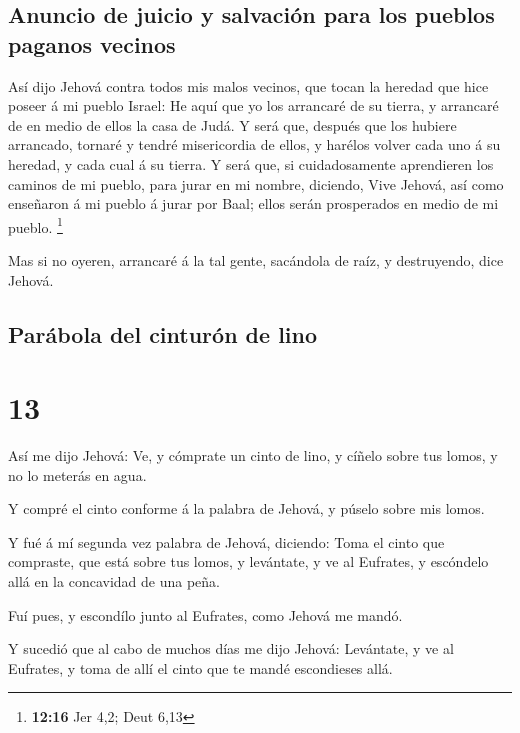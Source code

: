 \hypertarget{anuncio-de-juicio-y-salvaciuxf3n-para-los-pueblos-paganos-vecinos}{%
\subsection{Anuncio de juicio y salvación para los pueblos paganos
vecinos}\label{anuncio-de-juicio-y-salvaciuxf3n-para-los-pueblos-paganos-vecinos}}

 Así dijo Jehová contra todos mis malos vecinos, que tocan
la heredad que hice poseer á mi pueblo Israel: He aquí que yo los
arrancaré de su tierra, y arrancaré de en medio de ellos la casa de
Judá.  Y será que, después que los hubiere arrancado,
tornaré y tendré misericordia de ellos, y harélos volver cada uno á su
heredad, y cada cual á su tierra.  Y será que, si
cuidadosamente aprendieren los caminos de mi pueblo, para jurar en mi
nombre, diciendo, Vive Jehová, así como enseñaron á mi pueblo á jurar
por Baal; ellos serán prosperados en medio de mi pueblo. \footnote{\textbf{12:16}
  Jer 4,2; Deut 6,13}

 Mas si no oyeren, arrancaré á la tal gente, sacándola de
raíz, y destruyendo, dice Jehová.

\hypertarget{paruxe1bola-del-cinturuxf3n-de-lino}{%
\subsection{Parábola del cinturón de
lino}\label{paruxe1bola-del-cinturuxf3n-de-lino}}

\hypertarget{section-12}{%
\section{13}\label{section-12}}

 Así me dijo Jehová: Ve, y cómprate un cinto de lino, y
cíñelo sobre tus lomos, y no lo meterás en agua.

 Y compré el cinto conforme á la palabra de Jehová, y púselo
sobre mis lomos.

 Y fué á mí segunda vez palabra de Jehová, diciendo:
 Toma el cinto que compraste, que está sobre tus lomos, y
levántate, y ve al Eufrates, y escóndelo allá en la concavidad de una
peña.

 Fuí pues, y escondílo junto al Eufrates, como Jehová me
mandó.

 Y sucedió que al cabo de muchos días me dijo Jehová:
Levántate, y ve al Eufrates, y toma de allí el cinto que te mandé
escondieses allá.

